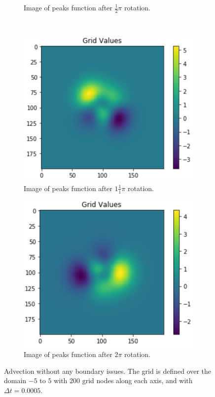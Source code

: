 \begin{figure}[H]
\begin{subfigure}[b]{0.40\linewidth}
		\caption{Image of peaks function after $\frac{1}{2}\pi$ rotation.}
		\label{ot1}
	\end{subfigure}
	\\
	\begin{subfigure}[b]{0.40\linewidth}
		\centering
		\includegraphics[width=\linewidth]{Materials/Lagrangian/ot2}
		\caption{Image of peaks function after $1\frac{1}{1}\pi$ rotation.}
		\label{ot2}
	\end{subfigure}
	\hfill
	\begin{subfigure}[b]{0.40\linewidth}
		\centering
		\includegraphics[width=\linewidth]{Materials/Lagrangian/ot3}
		\caption{Image of peaks function after $2\pi$ rotation.}
		\label{ot3}
	\end{subfigure}
	\caption{Advection without any boundary issues. The grid is defined over the domain $-5$ to $5$ with 200 grid nodes along each axis, and with $\Delta t = 0.0005$.}
	\label{original}
\end{figure}
